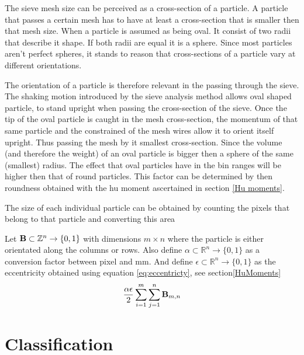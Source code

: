 \documentclass[11pt,fleqn,,a4paper,twoside,openright]{book}
\begin{document}
\begin{theorem}
	The sieve mesh size can be perceived as a cross-section of a particle. A particle that passes a certain mesh has to have at least a cross-section that is smaller then that mesh size. When a particle is assumed as being oval. It consist of two radii that describe it shape. If both radii are equal it is a sphere. Since most particles aren't perfect spheres, it stands to reason that cross-sections of a particle vary at different orientations.
	
	The orientation of a particle is therefore relevant in the passing through the sieve. The shaking motion introduced by the sieve analysis method allows oval shaped particle, to stand upright when passing the cross-section of the sieve. Once the tip of the oval particle is caught in the mesh cross-section, the momentum of that same particle and the constrained of the mesh wires allow it to orient itself upright. Thus passing the mesh by it smallest cross-section. Since the volume (and therefore the weight) of an oval particle is bigger then a sphere of the same (smallest) radius. The effect that oval particles have in the bin ranges will be higher then that of round particles. This factor can be determined by then roundness obtained with the hu moment ascertained in section \ref{Hu moments}.
\end{theorem}

The size of each individual particle can be obtained by counting the pixels that belong to that particle and converting this area 
\begin{sBox}
	Let $\mat{B} \subset \mathbb{Z}^n \rightarrow \{0, 1\}$ with dimensions $ m \times n $ where the particle is either orientated along the columns or rows. Also define $ \alpha \subset \mathbb{R}^n \rightarrow \{0, 1\} $ as a conversion factor between pixel and mm. And define $ \epsilon \subset \mathbb{R}^n \rightarrow \{0, 1\} $ as the eccentricity obtained using equation \ref{eq:eccentricty}, see section\ref{HuMoments}
	\begin{equation}\label{key}
		\frac{\alpha \epsilon}{2} \sum\limits_{i=1}^{m}\sum\limits_{j=1}^{n}\mat{B}_{m,n} 
	\end{equation}
\end{sBox}

\section{Classification}
\end{document}
